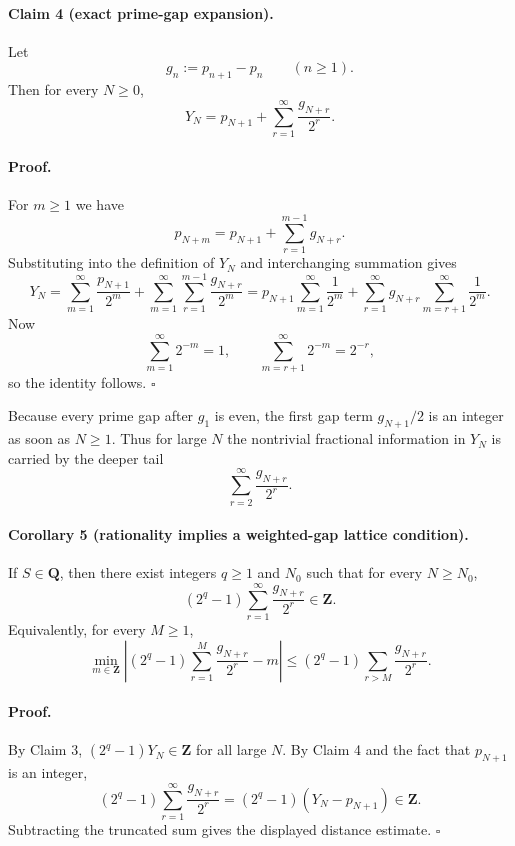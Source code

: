 \medskip

\paragraph{Claim 4 (exact prime-gap expansion).}
Let
\[
g_n:=p_{n+1}-p_n\qquad (n\ge 1).
\]
Then for every $N\ge 0$,
\[
Y_N = p_{N+1}+\sum_{r=1}^{\infty}\frac{g_{N+r}}{2^r}.
\]

\paragraph{Proof.}
For $m\ge 1$ we have
\[
p_{N+m}=p_{N+1}+\sum_{r=1}^{m-1} g_{N+r}.
\]
Substituting into the definition of $Y_N$ and interchanging summation gives
\[
Y_N
= \sum_{m=1}^{\infty}\frac{p_{N+1}}{2^m}
  + \sum_{m=1}^{\infty}\sum_{r=1}^{m-1}\frac{g_{N+r}}{2^m}
= p_{N+1}\sum_{m=1}^{\infty}\frac1{2^m}
  + \sum_{r=1}^{\infty} g_{N+r}\sum_{m=r+1}^{\infty}\frac1{2^m}.
\]
Now
\[
\sum_{m=1}^{\infty}2^{-m}=1,
\qquad
\sum_{m=r+1}^{\infty}2^{-m}=2^{-r},
\]
so the identity follows.
\hfill$\square$

Because every prime gap after $g_1$ is even, the first gap term $g_{N+1}/2$ is an integer as soon as $N\ge 1$. Thus for large $N$ the nontrivial fractional information in $Y_N$ is carried by the deeper tail
\[
\sum_{r=2}^{\infty}\frac{g_{N+r}}{2^r}.
\]

\medskip

\paragraph{Corollary 5 (rationality implies a weighted-gap lattice condition).}
If $S\in\mathbf{Q}$, then there exist integers $q\ge 1$ and $N_0$ such that for every $N\ge N_0$,
\[
(2^q-1)\sum_{r=1}^{\infty}\frac{g_{N+r}}{2^r}\in \mathbf{Z}.
\]
Equivalently, for every $M\ge 1$,
\[
\min_{m\in\mathbf{Z}}
\left|
(2^q-1)\sum_{r=1}^{M}\frac{g_{N+r}}{2^r}-m
\right|
\le (2^q-1)\sum_{r>M}\frac{g_{N+r}}{2^r}.
\]

\paragraph{Proof.}
By Claim 3, $(2^q-1)Y_N\in\mathbf{Z}$ for all large $N$. By Claim 4 and the fact that $p_{N+1}$ is an integer,
\[
(2^q-1)\sum_{r=1}^{\infty}\frac{g_{N+r}}{2^r}
= (2^q-1)(Y_N-p_{N+1})
\in\mathbf{Z}.
\]
Subtracting the truncated sum gives the displayed distance estimate.
\hfill$\square$

\medskip

